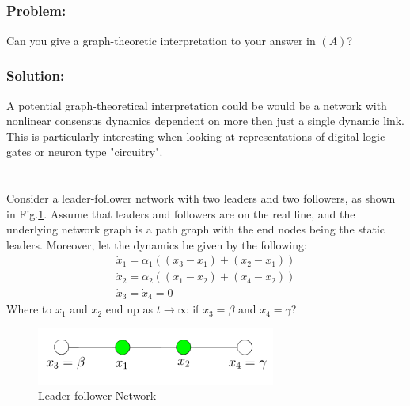 \documentclass[]{article}
\numberwithin{equation}{section}
\renewcommand{\figurename}{Fig.}
\begin{document}
\subsection{}
\subsubsection*{Problem:}
Can you give a graph-theoretic interpretation to your answer in $(A)$?

\subsubsection*{Solution:}
A potential graph-theoretical interpretation could be would be a network with nonlinear consensus dynamics dependent on more then just a single dynamic link. 
This is particularly interesting when looking at representations of digital logic gates or neuron type "circuitry".

\newpage
\section{}
Consider a leader-follower network with two leaders and two followers, as shown in \figurename \ref{fig:pblm3}. 
Assume that leaders and followers are on the real line, and the underlying network graph is a path graph with the end nodes being the static leaders.
Moreover, let the dynamics be given by the following:
\begin{gather*}
    \dot{x}_1 = \alpha_1((x_3-x_1) + (x_2 - x_1))\\
    \dot{x}_2 = \alpha_2((x_1-x_2) + (x_4 - x_2))\\
    \dot{x}_3 = \dot{x}_4 = 0
\end{gather*}
Where to $x_1$ and $x_2$ end up as $t \to \infty$ if $x_3 = \beta$ and $x_4 = \gamma$?

\begin{figure}[h]
    \centering
    \includegraphics[width=0.7\textwidth]{figs/pblm3.png}
    \caption{Leader-follower Network}
    \label{fig:pblm3}
\end{figure}
\end{document}
